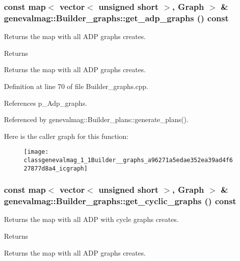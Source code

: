 \hypertarget{classgenevalmag_1_1Builder__graphs_a96271a5edae352ea39ad4f627877d8a4}{
\subsubsection[{get\_\-adp\_\-graphs}]{\setlength{\rightskip}{0pt plus 5cm}const map$<$ vector$<$ unsigned short $>$, {\bf Graph} $>$ \& genevalmag::Builder\_\-graphs::get\_\-adp\_\-graphs () const}}
\label{classgenevalmag_1_1Builder__graphs_a96271a5edae352ea39ad4f627877d8a4}
Returns the map with all ADP graphs creates. \begin{DoxyReturn}{Returns}

\end{DoxyReturn}
Returns the map with all ADP graphs creates. 

Definition at line 70 of file Builder\_\-graphs.cpp.



References p\_\-Adp\_\-graphs.



Referenced by genevalmag::Builder\_\-plans::generate\_\-plans().



Here is the caller graph for this function:\nopagebreak
\begin{figure}[H]
\begin{center}
\leavevmode
\texttt{[image: classgenevalmag\_1\_1Builder\_\_graphs\_a96271a5edae352ea39ad4f627877d8a4\_icgraph]}
\end{center}
\end{figure}


\hypertarget{classgenevalmag_1_1Builder__graphs_a4abbda95aa3d42fc06328c31ff5d63e1}{
\subsubsection[{get\_\-cyclic\_\-graphs}]{\setlength{\rightskip}{0pt plus 5cm}const map$<$ vector$<$ unsigned short $>$, {\bf Graph} $>$ \& genevalmag::Builder\_\-graphs::get\_\-cyclic\_\-graphs () const}}
\label{classgenevalmag_1_1Builder__graphs_a4abbda95aa3d42fc06328c31ff5d63e1}
Returns the map with all ADP with cycle graphs creates. \begin{DoxyReturn}{Returns}

\end{DoxyReturn}
Returns the map with all ADP graphs creates. 

